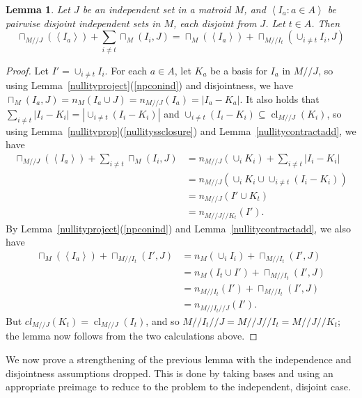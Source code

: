 \documentclass{amsart}
\theoremstyle{plain}
\newtheorem{lemma}[theorem]{Lemma}
\theoremstyle{definition}
\newcommand{\dcon}{/ \!\! /}
\DeclareMathOperator{\cl}{cl}
\newcommand{\abs}[1]{\left| #1 \right|}
\newcommand{\ab}[1]{\left\langle#1\right\rangle}
\renewcommand{\ss}{\subseteq}
\begin{document}
\begin{lemma}\label{lcconweak}
  Let $J$ be an independent set in a matroid $M$, and $\ab{I_a : a \in A}$ be pairwise disjoint independent sets in $M$, 
  each disjoint from $J$. Let $t \in A$. Then 
  \[\sqcap_{M \dcon J}(\ab{I_a}) + \sum_{i \ne t} \sqcap_M(I_i, J) = 
  \sqcap_M(\ab{I_a}) + \sqcap_{M \dcon I_t}(\cup_{i \ne t} I_i, J)\]
\end{lemma}
\begin{proof}
  Let $I' = \cup_{i \ne t} I_i$.
  For each $a \in A$, let $K_a$ be a basis for $I_a$ in $M \dcon J$, so using Lemma~\ref{nullityproject}(\ref{npconind}) 
  and disjointness, we have $\sqcap_M(I_a,J) = n_M(I_a \cup J) = n_{M \dcon J}(I_a) = |I_a - K_a|$. 
  It also holds that $\sum_{i \ne t} \abs{I_i - K_i} = \abs{\cup_{i \ne t} (I_i - K_i)}$ 
  and $\cup_{i \ne t}(I_i - K_i) \ss \cl_{M \dcon J}(K_i)$,
  so using Lemma~\ref{nullityprop}(\ref{nullityssclosure}) and Lemma~\ref{nullitycontractadd}, we have
  \begin{align*}
    \sqcap_{M \dcon J}(\ab{I_a}) + \sum_{i \ne t} \sqcap_M(I_i, J)
    &= n_{M \dcon J}(\cup_i K_i) + \sum_{i \ne t} \abs{I_i - K_i} \\
    &= n_{M \dcon J}(\cup_i K_i \cup \cup_{i \ne t} (I_i - K_i)) \\ 
    &= n_{M \dcon J}(I' \cup K_t) \\
    &= n_{M \dcon J \dcon K_t}(I').
  \end{align*}
  By Lemma~\ref{nullityproject}(\ref{npconind}) and Lemma~\ref{nullitycontractadd}, we also have 
  \begin{align*}
    \sqcap_M(\ab{I_a}) + \sqcap_{M \dcon I_t}(I', J)
    &= n_M(\cup_i I_i) + \sqcap_{M \dcon I_t}(I', J) \\
    &= n_M(I_t \cup I') + \sqcap_{M \dcon I_t}(I', J) \\
    &= n_{M \dcon I_t}(I') + \sqcap_{M \dcon I_t}(I', J) \\
    &= n_{M \dcon I_t \dcon J}(I').
  \end{align*} 
  But $cl_{M \dcon J}(K_t) = \cl_{M \dcon J}(I_t)$, and so $M \dcon I_t \dcon J = M \dcon J \dcon I_t = M \dcon J \dcon K_t$;
  the lemma now follows from the two calculations above. 
\end{proof}

We now prove a strengthening of the previous lemma with the independence and disjointness assumptions dropped. 
This is done by taking bases and using an appropriate preimage to reduce to the problem to the independent, disjoint case. 
\end{document}
